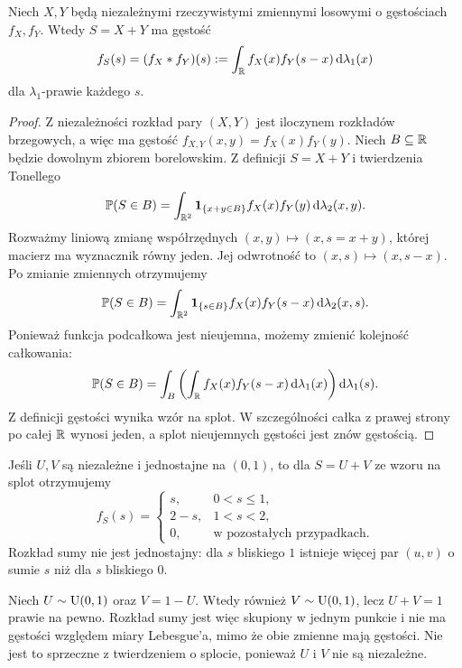 \begin{twierdzenie}[Splot]
Niech $X,Y$ będą niezależnymi rzeczywistymi zmiennymi losowymi
o gęstościach $f_X,f_Y$. Wtedy $S=X+Y$ ma gęstość
\begin{equation}\label{eq:convolution}
 f_S(s)=(f_X*f_Y)(s)
 :=\int_{\mathbb{R}} f_X(x)f_Y(s-x)\,\mathrm{d}\lambda_1(x)
\end{equation}
dla $\lambda_1$-prawie każdego $s$.
\end{twierdzenie}
\begin{proof}
Z niezależności rozkład pary $(X,Y)$ jest iloczynem
rozkładów brzegowych, a więc ma gęstość
$f_{X,Y}(x,y)=f_X(x)f_Y(y)$.
Niech $B\subseteq\mathbb{R}$ będzie dowolnym zbiorem borelowskim.
Z definicji $S=X+Y$ i twierdzenia Tonellego
\[
\mathbb{P}(S\in B)=\int_{\mathbb{R}^2}\mathbf{1}_{\{x+y\in B\}}
 f_X(x)f_Y(y)\,\mathrm{d}\lambda_2(x,y).
\]
Rozważmy liniową zmianę współrzędnych
$(x,y)\mapsto (x,s=x+y)$, której macierz ma wyznacznik
równy jeden. Jej odwrotność to $(x,s)\mapsto(x,s-x)$.
Po zmianie zmiennych otrzymujemy
\[
\mathbb{P}(S\in B)=\int_{\mathbb{R}^2}\mathbf{1}_{\{s\in B\}}
 f_X(x)f_Y(s-x)\,\mathrm{d}\lambda_2(x,s).
\]
Ponieważ funkcja podcałkowa jest nieujemna,
możemy zmienić kolejność całkowania:
\[
\mathbb{P}(S\in B)=\int_B\left(
\int_{\mathbb{R}} f_X(x)f_Y(s-x)\,\mathrm{d}\lambda_1(x)
\right)\mathrm{d}\lambda_1(s).
\]
Z definicji gęstości wynika wzór na splot. W szczególności
całka z prawej strony po całej $\mathbb{R}$ wynosi jeden,
a splot nieujemnych gęstości jest znów gęstością.
\end{proof}

\begin{przyklad}
Jeśli $U,V$ są niezależne i jednostajne na $(0,1)$,
to dla $S=U+V$ ze wzoru na splot otrzymujemy
\[
f_S(s)=\begin{cases}
s,&0<s\leq1,\\
2-s,&1<s<2,\\
0,&\text{w pozostałych przypadkach}.
\end{cases}
\]
Rozkład sumy nie jest jednostajny: dla $s$ bliskiego $1$
istnieje więcej par $(u,v)$ o sumie $s$ niż dla $s$ bliskiego $0$.
\end{przyklad}

\begin{przyklad}
Niech $U\sim\operatorname{U}(0,1)$ oraz $V=1-U$.
Wtedy również $V\sim\operatorname{U}(0,1)$, lecz $U+V=1$
prawie na pewno. Rozkład sumy jest więc skupiony
w jednym punkcie i nie ma gęstości względem miary
Lebesgue'a, mimo że obie zmienne mają gęstości.
Nie jest to sprzeczne z twierdzeniem o splocie,
ponieważ $U$ i $V$ nie są niezależne.
\end{przyklad}


